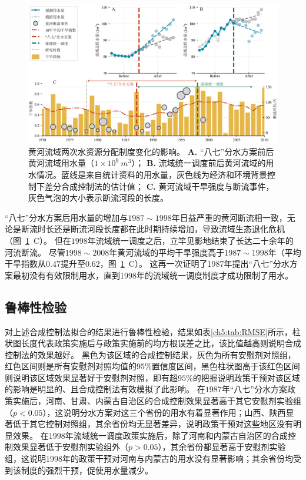 \begin{figure}[!ht]
	\centering
	\includegraphics[width=\linewidth]{img/ch5/ch5_results.png}
	\caption[黄河流域两次水资源分配制度变化的影响]{
        黄河流域两次水资源分配制度变化的影响。
        \textbf{A.} “八七”分水方案前后黄河流域用水量（$1 \times 10^9~m^3$）；
        \textbf{B.} 流域统一调度前后黄河流域的用水情况。蓝线是来自统计资料的用水量，灰色线为经济和环境背景控制下差分合成控制法的估计值；
        \textbf{C.} 黄河流域干旱强度与断流事件，灰色气泡的大小表示断流河段的长度。
	}\label{ch5:fig:main_results}
\end{figure}

“八七”分水方案后用水量的增加与$1987 \sim 1998$年日益严重的黄河断流相一致，无论是断流时长还是断流河段长度都在此时期持续增加，导致流域生态退化危机（图~\ref{ch5:fig:main_results}~C）。
但在$1998$年流域统一调度之后，立竿见影地结束了长达二十余年的河流断流。
尽管$1998 \sim 2008$年黄河流域的平均干旱强度高于$1987 \sim 1998$年（平均干旱指数从$0.47$提升至$0.62$，图~\ref{ch5:fig:main_results}~C）。
这再一次证明了1987年提出“八七”分水方案最初没有有效限制用水，直到1998年的流域统一调度制度才成功限制了用水。

\subsection{鲁棒性检验}

对上述合成控制法拟合的结果进行鲁棒性检验，结果如表\ref{ch5:tab:RMSE}所示，柱状图长度代表政策实施后与政策实施前的均方根误差之比，该比值越高则说明合成控制法的效果越好。
黑色为该区域的合成控制结果，灰色为所有安慰剂对照组，红色区间则是所有安慰剂对照均值的$95\%$置信度区间，黑色柱状图高于该红色区间则说明该区域效果显著好于安慰剂对照，即有超$95\%$的把握说明政策干预对该区域的影响是明显的、且合成控制法有效模拟了此影响。
在$1987$年“八七”分水方案政策实施后，河南、甘肃、内蒙古自治区的合成控制效果显著高于其它安慰剂实验组（$p < 0.05$），这说明分水方案对这三个省份的用水有着显著作用；山西、陕西显著低于其它控制对照组，其余省份均无显著差异，说明政策干预对这些地区没有明显效果。
在$1998$年流域统一调度政策实施后，除了河南和内蒙古自治区的合成控制效果显著低于安慰剂实验组外（$p > 0.05$），其余省份都显著高于安慰剂实验组，这说明$1998$年的政策干预对河南与内蒙古的用水没有显著影响；其余省份均受到该制度的强烈干预，促使用水量减少。

